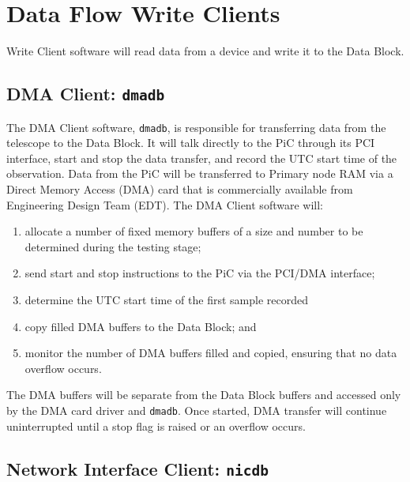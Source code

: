 \section{Data Flow Write Clients}

Write Client software will read data from a device and write it to
the Data Block.

\subsection{DMA Client: {\tt dmadb}}

The DMA Client software, {\tt dmadb}, is responsible for transferring
data from the telescope to the Data Block.  It will talk directly to
the PiC through its PCI interface, start and stop the data transfer,
and record the UTC start time of the observation.  Data from the PiC
will be transferred to Primary node RAM via a Direct Memory Access
(DMA) card that is commercially available from Engineering Design Team
(EDT).  The DMA Client software will:

\begin{enumerate}

\item allocate a number of fixed memory buffers of a size and number
to be determined during the testing stage;

\item send start and stop instructions to the PiC via the PCI/DMA interface;

\item determine the UTC start time of the first sample recorded

\item copy filled DMA buffers to the Data Block; and

\item monitor the number of DMA buffers filled and copied, ensuring that
no data overflow occurs.

\end{enumerate}

\noindent
The DMA buffers will be separate from the Data Block buffers and
accessed only by the DMA card driver and {\tt dmadb}.  Once started,
DMA transfer will continue uninterrupted until a stop flag is raised
or an overflow occurs.

\subsection{Network Interface Client: {\tt nicdb}}

